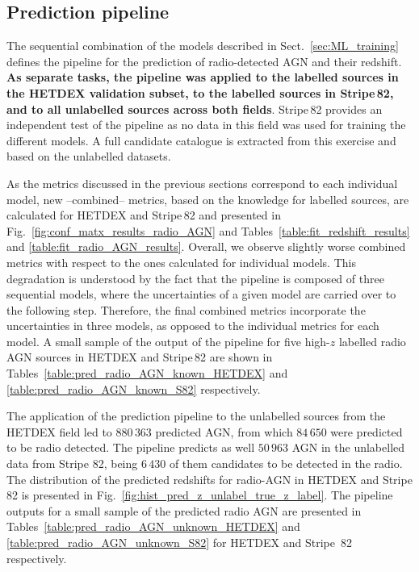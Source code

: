 \documentclass{aa}
\begin{document}
\subsection{Prediction pipeline}\label{sec:results_prediction_pipeline}

The sequential combination of the models described in Sect.~\ref{sec:ML_training} defines the pipeline for the prediction of radio-detected AGN and their redshift. \textbf{As separate tasks, the pipeline was applied to the labelled sources in the HETDEX validation subset, to the labelled sources in Stripe\,82, and to all unlabelled sources across both fields}. Stripe\,82 provides an independent test of the pipeline as no data in this field was used for training the different models. A full candidate catalogue is extracted from this exercise and based on the unlabelled datasets.

As the metrics discussed in the previous sections correspond to each individual model, new --combined-- metrics, based on the knowledge for labelled sources, are calculated for HETDEX and Stripe\,82 and presented in Fig.~\ref{fig:conf_matx_results_radio_AGN} and Tables~\ref{table:fit_redshift_results} and \ref{table:fit_radio_AGN_results}. 
Overall, we observe slightly worse combined metrics  with respect to the ones calculated for individual models. This degradation is understood by the fact that the pipeline is composed of three sequential models, where the uncertainties of a given model are carried over to the following step. Therefore, the final combined metrics incorporate the uncertainties in three models, as opposed to the individual metrics for each model.
A small sample of the output of the pipeline for five high-$z$ labelled radio AGN sources in HETDEX and Stripe\,82 are shown in Tables~\ref{table:pred_radio_AGN_known_HETDEX} and \ref{table:pred_radio_AGN_known_S82} respectively.

The application of the prediction pipeline to the unlabelled sources from the HETDEX field led to $880\,363$ predicted AGN, from which $84\,650$ were predicted to be radio detected. The pipeline predicts as well $50\,963$ AGN in the unlabelled data from Stripe 82, being $6\,430$ of them candidates to be detected in the radio. 
The distribution of the predicted redshifts for radio-AGN in HETDEX and Stripe 82 is presented in  Fig.~\ref{fig:hist_pred_z_unlabel_true_z_label}. The pipeline outputs for a small sample of the predicted radio AGN are presented in Tables~\ref{table:pred_radio_AGN_unknown_HETDEX} and \ref{table:pred_radio_AGN_unknown_S82} for HETDEX and Stripe\, 82 respectively.
\end{document}
